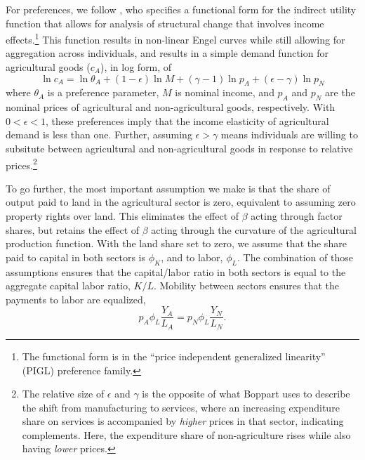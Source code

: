 \documentclass[11pt]{article}
\begin{document}
For preferences, we follow \cite{boppart2014}, who specifies a functional form for the indirect utility function that allows for analysis of structural change that involves income effects.\footnote{The functional form is in the ``price independent generalized linearity'' (PIGL) preference family.} This function results in non-linear Engel curves while still allowing for aggregation across individuals, and results in a simple demand function for agricultural goods ($c_A$), in log form, of
\begin{equation}
    \ln c_A = \ln \theta_A + (1-\epsilon) \ln M + (\gamma - 1) \ln p_A + (\epsilon - \gamma) \ln p_N \label{EQ_ca_demand}
\end{equation}
where $\theta_A$ is a preference parameter, $M$ is nominal income, and $p_A$ and $p_N$ are the nominal prices of agricultural and non-agricultural goods, respectively. With $0 < \epsilon < 1$, these preferences imply that the income elasticity of agricultural demand is less than one. Further, assuming $\epsilon > \gamma$ means individuals are willing to subsitute between agricultural and non-agricultural goods in response to relative prices.\footnote{The relative size of $\epsilon$ and $\gamma$ is the opposite of what Boppart uses to describe the shift from manufacturing to services, where an increasing expenditure share on services is accompanied by \textit{higher} prices in that sector, indicating complements. Here, the expenditure share of non-agriculture rises while also having \textit{lower} prices.}

To go further, the most important assumption we make is that the share of output paid to land in the agricultural sector is zero, equivalent to assuming zero property rights over land. This eliminates the effect of $\beta$ acting through factor shares, but retains the effect of $\beta$ acting through the curvature of the agricultural production function. With the land share set to zero, we assume that the share paid to capital in both sectors is $\phi_K$, and to labor, $\phi_L$. The combination of those assumptions ensures that the capital/labor ratio in both sectors is equal to the aggregate capital labor ratio, $K/L$. Mobility between sectors ensures that the payments to labor are equalized,
\begin{equation}
    p_A \phi_L \frac{Y_A}{L_A} = p_N \phi_L \frac{Y_N}{L_N}. \label{EQ_mobility}
\end{equation}
\end{document}
